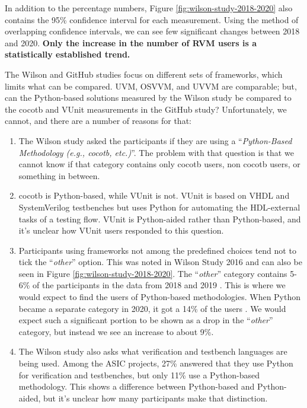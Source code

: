 \documentclass[]{article}
\providecommand{\tightlist}{%
  \setlength{\itemsep}{0pt}\setlength{\parskip}{0pt}}
\begin{document}
In addition to the percentage numbers, Figure \ref{fig:wilson-study-2018-2020} also contains the 95\% confidence interval for each measurement. Using the method of overlapping confidence intervals, we can see few significant changes between 2018 and 2020. \textbf{Only the increase in the number of RVM users is a statistically established trend.}

The Wilson and GitHub studies focus on different sets of frameworks, which limits what can be compared. UVM, OSVVM, and UVVM are comparable; but, can the Python-based solutions measured by the Wilson study be compared to the cocotb and VUnit measurements in the GitHub study? Unfortunately, we cannot, and there are a number of reasons for that:

\begin{enumerate}
\def\labelenumi{\arabic{enumi}.}
\tightlist
\item
  The Wilson study asked the participants if they are using a ``\emph{Python-Based Methodology (e.g., cocotb, etc.)}''. The problem with that question is that we cannot know if that category contains only cocotb users, non cocotb users, or something in between.
\item
  cocotb is Python-based, while VUnit is not. VUnit is based on VHDL and SystemVerilog testbenches but uses Python for automating the HDL-external tasks of a testing flow. VUnit is Python-aided rather than Python-based, and it's unclear how VUnit users responded to this question.
\item
  Participants using frameworks not among the predefined choices tend not to tick the ``\emph{other}'' option. This was noted in Wilson Study 2016 \autocite{wilson16} and can also be seen in Figure \ref{fig:wilson-study-2018-2020}. The ``\emph{other}'' category contains 5-6\% of the participants in the data from 2018 and 2019 \autocite{wilson18}. This is where we would expect to find the users of Python-based methodologies. When Python became a separate category in 2020, it got a 14\% of the users \autocite{wilson20}. We would expect such a significant portion to be shown as a drop in the ``\emph{other}'' category, but instead we see an increase to about 9\%.
\item
  The Wilson study also asks what verification and testbench languages are being used. Among the ASIC projects, 27\% answered that they use Python for verification and testbenches, but only 11\% use a Python-based methodology. This shows a difference between Python-based and Python-aided, but it's unclear how many participants make that distinction.
\end{enumerate}
\end{document}
